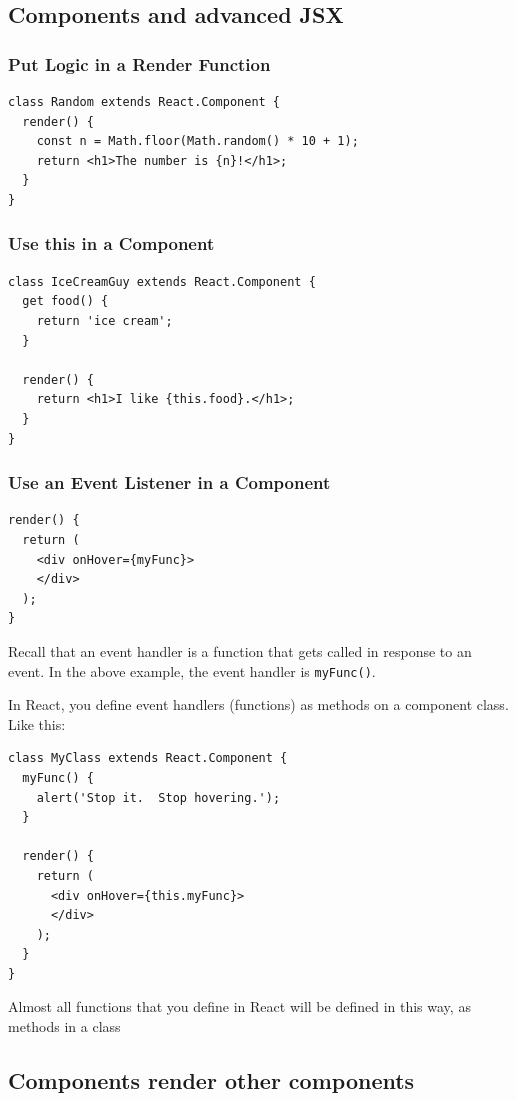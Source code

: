 \documentclass[a4paper, 12pt]{article}
\begin{document}
\subsection{Components and advanced JSX}
\subsubsection{Put Logic in a Render Function}
\begin{verbatim}
class Random extends React.Component {
  render() {   
    const n = Math.floor(Math.random() * 10 + 1);    
    return <h1>The number is {n}!</h1>;
  }
}
\end{verbatim}

\subsubsection{Use this in a Component}
\begin{verbatim}
class IceCreamGuy extends React.Component {
  get food() {
    return 'ice cream';
  }

  render() {
    return <h1>I like {this.food}.</h1>;
  }
}
\end{verbatim}

\subsubsection{Use an Event Listener in a Component}
\begin{verbatim}
render() {
  return (
    <div onHover={myFunc}>
    </div>
  );
}
\end{verbatim}
Recall that an event handler is a function that gets called in response to an event. In the above example, the event handler is \verb|myFunc()|.

In React, you define event handlers (functions) as methods on a component class. Like this:
\begin{verbatim}
class MyClass extends React.Component {
  myFunc() {
    alert('Stop it.  Stop hovering.');
  }

  render() {
    return (
      <div onHover={this.myFunc}>
      </div>
    );
  }
}
\end{verbatim}
Almost all functions that you define in React will be defined in this way, as methods in a class


\subsection{Components render other components}
\end{document}
